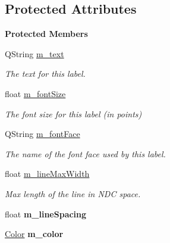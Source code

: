 \subsection*{Protected Attributes}
\begin{Indent}\textbf{ Protected Members}\par
\begin{DoxyCompactItemize}
\item 
\mbox{\label{classrev_1_1_label_a06fed49151f92bd214c3fdf62f71a75b}} 
Q\+String \mbox{\hyperlink{classrev_1_1_label_a06fed49151f92bd214c3fdf62f71a75b}{m\+\_\+text}}
\begin{DoxyCompactList}\small\item\em The text for this label. \end{DoxyCompactList}\item 
\mbox{\label{classrev_1_1_label_a9295c4e08af0e14380ec4469b4bbbcf6}} 
float \mbox{\hyperlink{classrev_1_1_label_a9295c4e08af0e14380ec4469b4bbbcf6}{m\+\_\+font\+Size}}
\begin{DoxyCompactList}\small\item\em The font size for this label (in points) \end{DoxyCompactList}\item 
\mbox{\label{classrev_1_1_label_a8cd71c4fb1994714958f856153b3aff3}} 
Q\+String \mbox{\hyperlink{classrev_1_1_label_a8cd71c4fb1994714958f856153b3aff3}{m\+\_\+font\+Face}}
\begin{DoxyCompactList}\small\item\em The name of the font face used by this label. \end{DoxyCompactList}\item 
\mbox{\label{classrev_1_1_label_a41d56ca6baeb0bfbb6eeec79d0c5aa21}} 
float \mbox{\hyperlink{classrev_1_1_label_a41d56ca6baeb0bfbb6eeec79d0c5aa21}{m\+\_\+line\+Max\+Width}}
\begin{DoxyCompactList}\small\item\em Max length of the line in N\+DC space. \end{DoxyCompactList}\item 
\mbox{\label{classrev_1_1_label_ae6cd152b5002a6c960796e985f23bdea}} 
float {\bfseries m\+\_\+line\+Spacing}
\item 
\mbox{\label{classrev_1_1_label_ab37c3250d338852a6f1428fffaa48689}} 
\mbox{\hyperlink{classrev_1_1_color}{Color}} {\bfseries m\+\_\+color}
\end{DoxyCompactItemize}
\end{Indent}
